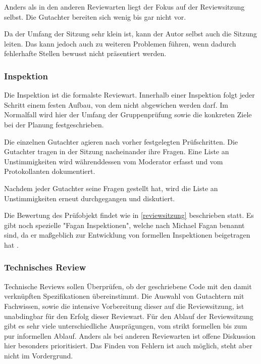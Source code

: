 \documentclass[	%
		fontsize=11pt,  %
		a4paper,	    %
		ngerman,		%
		sans,			%
		f4,				%
	]{HsH-report}		%
\begin{document}
Anders als in den anderen Reviewarten liegt der Fokus auf der Reviewsitzung
selbst. Die Gutachter bereiten sich wenig bis gar nicht vor.

Da der Umfang der Sitzung sehr klein ist, kann der Autor selbst auch die
Sitzung leiten. Das kann jedoch auch zu weiteren Problemen führen, wenn dadurch
fehlerhafte Stellen bewusst nicht präsentiert werden.

\subsubsection{Inspektion} \label{inspektion}

Die Inspektion ist die formalste Reviewart. Innerhalb einer Inspektion folgt
jeder Schritt einem festen Aufbau, von dem nicht abgewichen werden darf. Im
Normalfall wird hier der Umfang der Gruppenprüfung sowie die konkreten Ziele
bei der Planung festgeschrieben.

Die einzelnen Gutachter agieren nach vorher festgelegten Prüfschritten. Die
Gutachter tragen in der Sitzung nacheinander ihre Fragen. Eine Liste an
Unstimmigkeiten wird währenddessen vom Moderator erfasst und vom Protokollanten
dokumentiert.

Nachdem jeder Gutachter seine Fragen gestellt hat, wird die Liste an
Unstimmigkeiten erneut durchgegangen und diskutiert.

Die Bewertung des Prüfobjekt findet wie in \ref{reviewsitzung} beschrieben
statt. Es gibt noch spezielle "Fagan Inspektionen", welche nach Michael Fagan
benannt sind, da er maßgeblich zur Entwicklung von formellen Inspektionen
beigetragen hat \cite{Fagan2001}.

\subsubsection{Technisches Review} \label{technischesreview}

Technische Reviews sollen Überprüfen, ob der geschriebene Code mit den damit
verknüpften Spezifikationen übereinstimmt. Die Auswahl von Gutachtern mit
Fachwissen, sowie die intensive Vorbereitung dieser auf die Reviewsitzung, ist
unabdingbar für den Erfolg dieser Reviewart. Für den Ablauf der Reviewsitzung
gibt es sehr viele unterschiedliche Ausprägungen, vom strikt formellen bis zum
pur informellen Ablauf. Anders als bei anderen Reviewarten ist offene
Diskussion hier besonders prioritisiert. Das Finden von Fehlern ist auch
möglich, steht aber nicht im Vordergrund.
\end{document}
